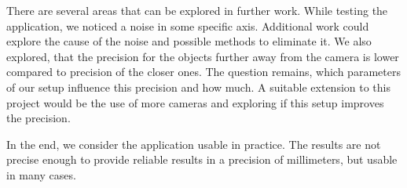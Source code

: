 There are several areas that can be explored in further work. While testing the
application, we noticed a noise in some specific axis. Additional work could
explore the cause of the noise and possible methods to eliminate it. We also
explored, that the precision for the objects further away from the camera is
lower compared to precision of the closer ones. The question remains, which
parameters of our setup influence this precision and how much. A suitable
extension to this project would be the use of more cameras and exploring if
this setup improves the precision.

In the end, we consider the application usable in practice. The results are not
precise enough to provide reliable results in a precision of millimeters, but
usable in many cases.
